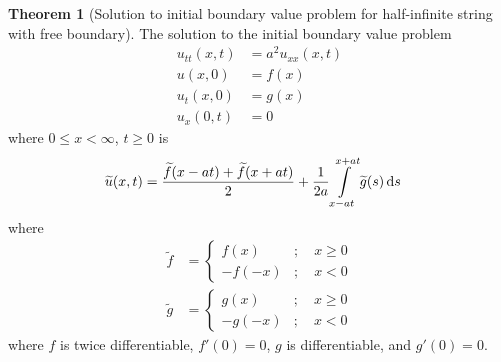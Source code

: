 \documentclass[titlepage, fleqn, a4paper, 12pt, twoside]{article}
\theoremstyle{definition}
\theoremstyle{theorem}
\newtheorem{theorem}{Theorem}
\renewcommand{\tilde}{\widetilde}
\begin{document}
\begin{theorem}[Solution to initial boundary value problem for half-infinite string with free boundary]
	The solution to the initial boundary value problem
	\begin{align*}
		u_{t t}(x,t) &= a^2 u_{x x}(x,t)\\
		u(x,0) &= f(x)\\
		u_t(x,0) &= g(x)\\
		u_x(0,t) &= 0
	\end{align*}
	where $0 \le x < \infty$, $t \ge 0$ is
	\begin{align*}
		\tilde{u}(x,t) &= \frac{\tilde{f}(x - a t) + \tilde{f}(x + a t)}{2} + \frac{1}{2 a} \int\limits_{x - a t}^{x + a t} \tilde{g}(s) \dif s
	\end{align*}
	where
	\begin{align*}
		\tilde{f} &=
			\begin{cases}
				f(x) &;\quad x \ge 0\\
				-f(-x) &;\quad x < 0
			\end{cases}\\
		\tilde{g} &=
			\begin{cases}
				g(x) &;\quad x \ge 0\\
				-g(-x) &;\quad x < 0
			\end{cases}
	\end{align*}
	where $f$ is twice differentiable, $f'(0) = 0$, $g$ is differentiable, and $g'(0) = 0$.
	\label{thm:Solution_to_initial_boundary_value_problem_for_half-infinite_string_with_free_boundary}
\end{theorem}
\end{document}
